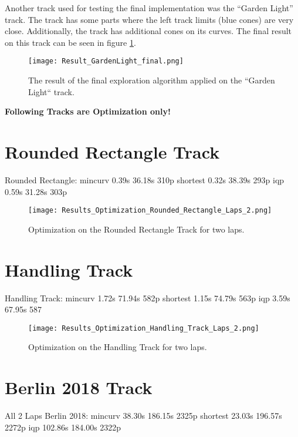Another track used for testing the final implementation was the ``Garden Light'' track. The track has some parts where the left track limits (blue cones) are very close. Additionally, the track has additional cones on its curves. The final result on this track can be seen in figure \ref{fig:Result Garden Light Final}.
\begin{figure}[H]
    \centering
    \texttt{[image: Result\_GardenLight\_final.png]}
    \caption{The result of the final exploration algorithm applied on the ``Garden Light`` track.}
    \label{fig:Result Garden Light Final}
\end{figure}

\textbf{Following Tracks are Optimization only!}

\section{Rounded Rectangle Track} \label{sec:Results Rounded Rectangle Track}
Rounded Rectangle:
mincurv 0.39s 36.18s 310p
shortest 0.32s 38.39s 293p
iqp 0.59s 31.28s 303p

\begin{figure}[H]
    \centering
    \texttt{[image: Results\_Optimization\_Rounded\_Rectangle\_Laps\_2.png]}
    \caption{Optimization on the Rounded Rectangle Track for two laps.}
    \label{fig:Results Rounded Rectangle Laps 2}
\end{figure}

\section{Handling Track} \label{sec:Results Handling Track}
Handling Track:
mincurv 1.72s 71.94s 582p
shortest 1.15s 74.79s 563p
iqp 3.59s 67.95s 587

\begin{figure}[H]
    \centering
    \texttt{[image: Results\_Optimization\_Handling\_Track\_Laps\_2.png]}
    \caption{Optimization on the Handling Track for two laps.}
    \label{fig:Results Handling Track Laps 2}
\end{figure}

\section{Berlin 2018 Track} \label{sec:Results Berlin 2018 Track}
All 2 Laps
Berlin 2018:
mincurv 38.30s 186.15s 2325p
shortest 23.03s 196.57s 2272p
iqp 102.86s 184.00s 2322p

